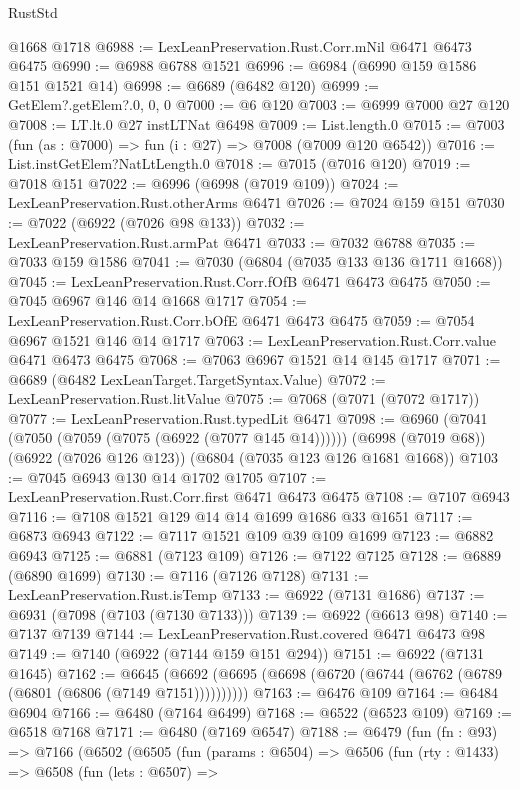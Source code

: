 \begin{lexlean}{RustStd}
\begin{coremodule}
    @1668
    @1718
@6988 := LexLeanPreservation.Rust.Corr.mNil @6471 @6473 @6475
@6990 := @6988 @6788 @1521
@6996 := @6984 (@6990 @159 @1586 @151 @1521 @14)
@6998 := @6689 (@6482 @120)
@6999 := GetElem?.getElem?.{0, 0, 0}
@7000 := @6 @120
@7003 := @6999 @7000 @27 @120
@7008 := LT.lt.{0} @27 instLTNat @6498
@7009 := List.length.{0}
@7015 := @7003 (fun (as : @7000) => fun (i : @27) => @7008 (@7009 @120 @6542))
@7016 := List.instGetElem?NatLtLength.{0}
@7018 := @7015 (@7016 @120)
@7019 := @7018 @151
@7022 := @6996 (@6998 (@7019 @109))
@7024 := LexLeanPreservation.Rust.otherArms @6471
@7026 := @7024 @159 @151
@7030 := @7022 (@6922 (@7026 @98 @133))
@7032 := LexLeanPreservation.Rust.armPat @6471
@7033 := @7032 @6788
@7035 := @7033 @159 @1586
@7041 := @7030 (@6804 (@7035 @133 @136 @1711 @1668))
@7045 := LexLeanPreservation.Rust.Corr.fOfB @6471 @6473 @6475
@7050 := @7045 @6967 @146 @14 @1668 @1717
@7054 := LexLeanPreservation.Rust.Corr.bOfE @6471 @6473 @6475
@7059 := @7054 @6967 @1521 @146 @14 @1717
@7063 := LexLeanPreservation.Rust.Corr.value @6471 @6473 @6475
@7068 := @7063 @6967 @1521 @14 @145 @1717
@7071 := @6689 (@6482 LexLeanTarget.TargetSyntax.Value)
@7072 := LexLeanPreservation.Rust.litValue
@7075 := @7068 (@7071 (@7072 @1717))
@7077 := LexLeanPreservation.Rust.typedLit @6471
@7098 := @6960
    (@7041 (@7050 (@7059 (@7075 (@6922 (@7077 @145 @14))))))
    (@6998 (@7019 @68))
    (@6922 (@7026 @126 @123))
    (@6804 (@7035 @123 @126 @1681 @1668))
@7103 := @7045 @6943 @130 @14 @1702 @1705
@7107 := LexLeanPreservation.Rust.Corr.first @6471 @6473 @6475
@7108 := @7107 @6943
@7116 := @7108 @1521 @129 @14 @14 @1699 @1686 @33 @1651
@7117 := @6873 @6943
@7122 := @7117 @1521 @109 @39 @109 @1699
@7123 := @6882 @6943
@7125 := @6881 (@7123 @109)
@7126 := @7122 @7125
@7128 := @6889 (@6890 @1699)
@7130 := @7116 (@7126 @7128)
@7131 := LexLeanPreservation.Rust.isTemp
@7133 := @6922 (@7131 @1686)
@7137 := @6931 (@7098 (@7103 (@7130 @7133)))
@7139 := @6922 (@6613 @98)
@7140 := @7137 @7139
@7144 := LexLeanPreservation.Rust.covered @6471 @6473 @98
@7149 := @7140 (@6922 (@7144 @159 @151 @294))
@7151 := @6922 (@7131 @1645)
@7162 := @6645 (@6692 (@6695 (@6698 (@6720 (@6744 (@6762 (@6789 (@6801 (@6806 (@7149 @7151))))))))))
@7163 := @6476 @109
@7164 := @6484 @6904
@7166 := @6480 (@7164 @6499)
@7168 := @6522 (@6523 @109)
@7169 := @6518 @7168
@7171 := @6480 (@7169 @6547)
@7188 := @6479
    (fun (fn : @93) =>
    @7166
      (@6502
        (@6505
          (fun (params : @6504) =>
          @6506
            (fun (rty : @1433) =>
            @6508
              (fun (lets : @6507) =>

\end{coremodule}
\end{lexlean}

